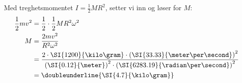 \documentclass[answers,a4paper,12pt]{exam}
\begin{document}
\begin{questions}
\begin{parts}
\begin{solution}
Med treghetsmomentet $I = \frac{1}{2} M R^{2}$, setter vi inn og løser for $M$:
\begin{align}
\frac{1}{2} m v^{2} &= \frac{1}{2} \cdot \frac{1}{2} M R^{2} \omega^{2} \\
M &= \frac{2 m v^{2}}{R^{2} \omega^{2}} \\
  &= \frac{2 \cdot \SI{1200}{\kilo\gram} \cdot \left(\SI{33.33}{\meter\per\second}\right)^{2}}{\left(\SI{0.12}{\meter}\right)^{2} \cdot \left(\SI{6283.19}{\radian\per\second}\right)^{2}} \\
  &= \doubleunderline{\SI{4.7}{\kilo\gram}}
\end{align}
\end{solution}

\end{parts}
\end{questions}
\end{document}
